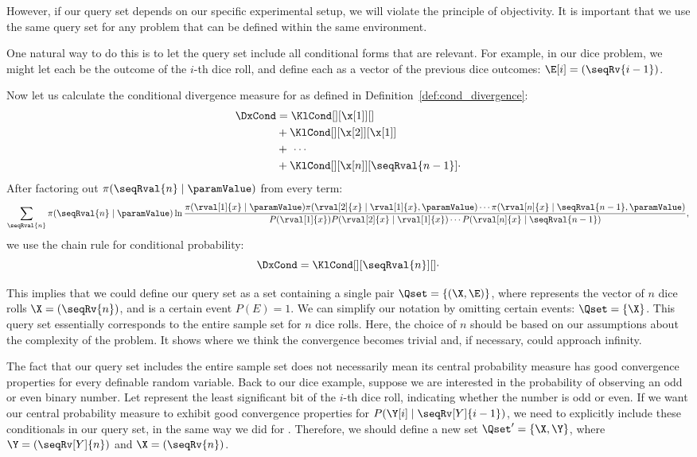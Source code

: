 However, if our query set depends on our specific experimental setup, we will violate the principle of objectivity.
It is important that we use the same query set for any problem that can be defined within the same environment.

One natural way to do this is to let the query set include all conditional forms that are relevant.
For example, in our dice problem, we might let each \X[i] be the outcome of the $i$-th dice roll, and define each \E[i]
as a vector of the previous dice outcomes: $\E[i] = (\seqRv{i-1})$.

Now let us calculate the conditional divergence measure for  as defined in Definition~\ref{def:cond_divergence}:
\begin{align*}
    \DxCond &= \KlCond[][{\x[1]}][ ] \\
    &+ \KlCond[][{\x[2]}][{\x[1]}] \\
    &+ \ \cdots \\
    &+ \KlCond[][{\x[n]}][\seqRval{n-1}]\cdot
\end{align*}
After factoring out $\pi(\seqRval{n} \mid \paramValue)$ from every term:
\[
    \sum_{\seqRval{n}} \pi(\seqRval{n} \mid \paramValue) \ln
    \frac
    {\pi(\rval[1]{x} \mid \paramValue) \pi(\rval[2]{x} \mid \rval[1]{x}, \paramValue)
    \cdots \pi(\rval[n]{x} \mid \seqRval{n-1}, \paramValue)}
    {P(\rval[1]{x}) P(\rval[2]{x} \mid \rval[1]{x}) \cdots P(\rval[n]{x} \mid \seqRval{n-1})},
\]
we use the chain rule for conditional probability:
\begin{equation}
    \DxCond = \KlCond[][\seqRval{n}][ ] \cdot
    \label{eq:joint_form}
\end{equation}

This implies that we could define our query set as a set containing a single pair $\Qset = \{ (\X,\E) \}$,
where \X represents the vector of $n$ dice rolls $\X = (\seqRv{n})$, and \E is a certain event $P(E) = 1$.
We can simplify our notation by omitting certain events:  $\Qset = \{\X\}$.
This query set essentially corresponds to the entire sample set for $n$ dice rolls.
Here, the choice of $n$ should be based on our assumptions about the complexity of the problem.
It shows where we think the convergence becomes trivial and, if necessary, could approach infinity.

The fact that our query set includes the entire sample set does not necessarily mean its central probability
measure has good convergence properties for every definable random variable.
Back to our dice example, suppose we are interested in the probability of observing an odd or even binary number.
Let \Y[i] represent the least significant bit of the $i$-th dice roll, indicating whether the number is odd or even.
If we want our central probability measure to exhibit good convergence properties for  $P(\Y[i] \mid \seqRv[Y]{i-1})$,
we need to explicitly include these conditionals in our query set, in the same way we did for \X[i].
Therefore, we should define a new set $\Qset' = \{\X, \Y\}$, where $\Y = (\seqRv[Y]{n})$ and $\X = (\seqRv{n})$.

